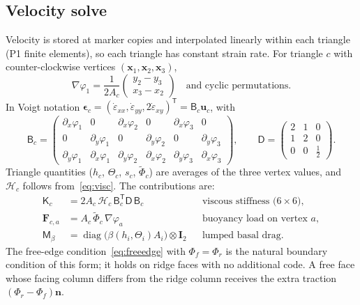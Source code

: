 \documentclass[11pt]{article}
\newcommand{\vect}[1]{\mathbf{#1}}
\newcommand{\edot}{\dot{\varepsilon}}
\newcommand{\Hint}{\mathcal{H}}
\begin{document}
\subsection{Velocity solve}
Velocity is stored at marker copies and interpolated linearly within each triangle (P1 finite elements), so each triangle has constant strain rate. For triangle $c$ with counter-clockwise vertices $(\vect{x}_1,\vect{x}_2,\vect{x}_3)$,
\begin{equation}
  \nabla\varphi_1 = \frac{1}{2A_c}\begin{pmatrix}y_2-y_3\\x_3-x_2\end{pmatrix}\quad\text{and cyclic permutations.}
\end{equation}
In Voigt notation $\boldsymbol\epsilon_c=(\edot_{xx},\edot_{yy},2\edot_{xy})^{\mathsf T}=\mathsf{B}_c\vect{u}_c$, with
\begin{equation}
  \mathsf{B}_c=\begin{pmatrix}
  \partial_x\varphi_1&0&\partial_x\varphi_2&0&\partial_x\varphi_3&0\\
  0&\partial_y\varphi_1&0&\partial_y\varphi_2&0&\partial_y\varphi_3\\
  \partial_y\varphi_1&\partial_x\varphi_1&\partial_y\varphi_2&\partial_x\varphi_2&\partial_y\varphi_3&\partial_x\varphi_3
  \end{pmatrix},
  \qquad
  \mathsf{D}=\begin{pmatrix}2&1&0\\1&2&0\\0&0&\tfrac12\end{pmatrix}.
\end{equation}
Triangle quantities ($h_c$, $\Theta_c$, $s_c$, $\tilde\Phi_c$) are averages of the three vertex values, and $\Hint_c$ follows from~\eqref{eq:visc}. The contributions are:
\begin{align}
  \mathsf{K}_c &= 2A_c\,\Hint_c\,\mathsf{B}_c^{\mathsf T}\mathsf{D}\,\mathsf{B}_c
    &&\text{viscous stiffness ($6\times6$)},\label{eq:Kc}\\
  \vect{F}_{c,a} &= A_c\,\tilde\Phi_c\,\nabla\varphi_a
    &&\text{buoyancy load on vertex $a$},\\
  \mathsf{M}_\beta &= \operatorname{diag}\big(\beta(h_i,\Theta_i)A_i\big)\otimes\vect{I}_2
    &&\text{lumped basal drag}.
\end{align}
The free-edge condition~\eqref{eq:freeedge} with $\Phi_f=\Phi_r$ is the natural boundary condition of this form; it holds on ridge faces with no additional code. A free face whose facing column differs from the ridge column receives the extra traction $(\Phi_r-\Phi_f)\vect{n}$.
\end{document}
